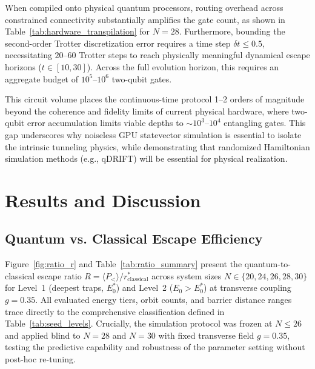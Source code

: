 \documentclass[10pt,twocolumn,a4paper]{article}
\begin{document}
\begin{table}[t]
\centering
\small
\caption{Two-qubit gate requirements for a single second-order Trotter step at $N = 28$ across physical hardware topologies compared to naive all-to-all synthesis.}
\label{tab:hardware_transpilation}
\end{table}

When compiled onto physical quantum processors, routing overhead across constrained connectivity substantially amplifies the gate count, as shown in Table~\ref{tab:hardware_transpilation} for $N = 28$. Furthermore, bounding the second-order Trotter discretization error requires a time step $\delta t \le 0.5$, necessitating $20$--$60$ Trotter steps to reach physically meaningful dynamical escape horizons ($t \in [10, 30]$). Across the full evolution horizon, this requires an aggregate budget of $10^5$--$10^6$ two-qubit gates. 

This circuit volume places the continuous-time protocol 1--2 orders of magnitude beyond the coherence and fidelity limits of current physical hardware, where two-qubit error accumulation limits viable depths to $\sim 10^3$--$10^4$ entangling gates. This gap underscores why noiseless GPU statevector simulation is essential to isolate the intrinsic tunneling physics, while demonstrating that randomized Hamiltonian simulation methods (e.g., qDRIFT) will be essential for physical realization.

\section{Results and Discussion}
\label{sec:results}
\subsection{Quantum vs. Classical Escape Efficiency}
Figure~\ref{fig:ratio_r} and Table~\ref{tab:ratio_summary} present the quantum-to-classical escape ratio $R = \langle P_< \rangle / r_{\mathrm{classical}}^*$ across system sizes $N \in \{20, 24, 26, 28, 30\}$ for Level~1 (deepest traps, $E_0^*$) and Level~2 ($E_0 > E_0^*$) at transverse coupling $g = 0.35$. All evaluated energy tiers, orbit counts, and barrier distance ranges trace directly to the comprehensive classification defined in Table~\ref{tab:seed_levels}. Crucially, the simulation protocol was frozen at $N \le 26$ and applied blind to $N = 28$ and $N = 30$ with fixed transverse field $g = 0.35$, testing the predictive capability and robustness of the parameter setting without post-hoc re-tuning.
\end{document}
